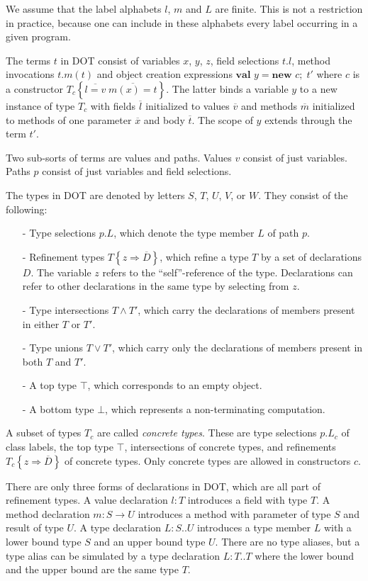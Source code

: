 \documentclass[9pt]{sigplanconf}
\newcommand{\tfun}{\rightarrow}
\newcommand{\tand}{\wedge}
\newcommand{\tor}{\vee}
\newcommand{\refine}[2]{\left\{#1 \Rightarrow #2 \right\}}
\newcommand{\ldefs}[1]{\left\{#1\right\}}
\newcommand{\seq}[1]{\overline{#1}}
\newcommand{\new}[3]{\textbf{val }#1 = \textbf{new }#2 ;\; #3}
\newcommand{\Ldecl}[3]{#1 : #2..#3}%
\newcommand{\ldecl}[2]{#1 : #2}
\newcommand{\mdecl}[3]{#1 : #2 \tfun #3}
\newcommand{\Top}{\top}%
\newcommand{\Bot}{\bot}%
\begin{document}
We assume that the label alphabets $l$, $m$ and $L$ are finite. This is
not a restriction in practice, because one can include in these 
alphabets every label occurring in a given program.

The terms $t$ in DOT consist of variables $x$, $y$, $z$, field
selections $t.l$, method invocations $t.m(t)$ and object creation
expressions $\new y c {t'}$ where $c$ is a constructor $T_c \ldefs{\seq{l
    = v}\;\seq{m(x) = t}}$. The latter binds a variable $y$ to a new
instance of type $T_c$ with fields $\seq l$ initialized to values
$\seq v$ and methods $\seq m$ initialized to methods of one parameter
$\seq{x}$ and body $\seq{t}$.  The scope of $y$ extends through the term
${t'}$.

Two sub-sorts of terms are values and paths. Values $v$ consist of
just variables. Paths $p$ consist of just variables and field
selections.

The types in DOT are denoted by letters $S$, $T$, $U$, $V$, or $W$. They consist of the following:
\begin{itemize}
\item[-] Type selections $p.L$, which denote the type member $L$ of path $p$.
\item[-] Refinement types $T \refine z {\seq D}$, which refine a type $T$ by a set of declarations $D$.
         The variable $z$ refers to the ``self''-reference of the type. Declarations can refer to
         other declarations in the same type by selecting from $z$.
\item[-] Type intersections $T \tand T'$, which carry the declarations of members present in either $T$ or $T'$.
\item[-] Type unions $T \tor T'$, which carry only the declarations of members present in both $T$ and $T'$.
\item[-] A top type $\Top$, which corresponds to an empty object.
\item[-] A bottom type $\Bot$, which represents a non-terminating computation.
\end{itemize}
A subset of types $T_c$ are called {\em concrete types}. These are type selections
$p.L_c$ of class labels,
the top type $\Top$, intersections of concrete types, and refinements $T_c \refine z {\seq D}$ of concrete types. Only concrete types are allowed in constructors $c$.

There are only three forms of declarations in DOT, which are all part
of refinement types.  A value declaration $\ldecl l T$ introduces a
field with type $T$.  A method declaration $\mdecl m S U$ introduces a
method with parameter of type $S$ and result of type $U$. A type
declaration $\Ldecl L S U$ introduces a type member $L$ with a lower
bound type $S$ and an upper bound type $U$. There are no type aliases,
but a type alias can be simulated by a type declaration $\Ldecl L T T$
where the lower bound and the upper bound are the same type $T$.
\end{document}
